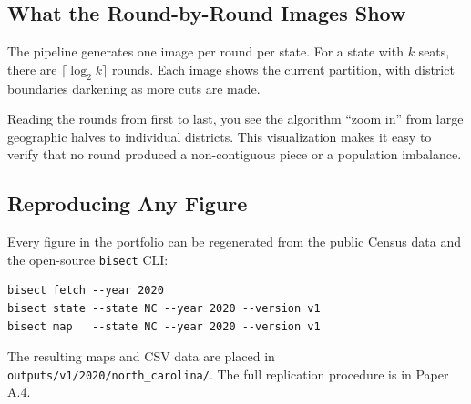 \subsection*{What the Round-by-Round Images Show}

The pipeline generates one image per round per state.
For a state with $k$ seats, there are $\lceil \log_2 k \rceil$ rounds.
Each image shows the current partition, with district boundaries
darkening as more cuts are made.

Reading the rounds from first to last, you see the algorithm
``zoom in'' from large geographic halves to individual districts.
This visualization makes it easy to verify that no round
produced a non-contiguous piece or a population imbalance.

\subsection*{Reproducing Any Figure}

Every figure in the portfolio can be regenerated from the public
Census data and the open-source \texttt{bisect} CLI:

\begin{verbatim}
bisect fetch --year 2020
bisect state --state NC --year 2020 --version v1
bisect map   --state NC --year 2020 --version v1
\end{verbatim}

\noindent The resulting maps and CSV data are placed in
\texttt{outputs/v1/2020/north\_carolina/}.
The full replication procedure is in Paper A.4.
